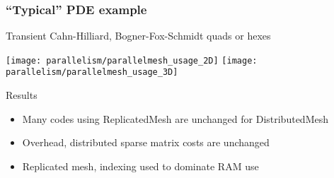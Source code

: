 


\begin{frame}
\frametitle{``Typical'' PDE example}

Transient Cahn-Hilliard, Bogner-Fox-Schmidt quads or hexes

  \texttt{[image: parallelism/parallelmesh\_usage\_2D]}
  \texttt{[image: parallelism/parallelmesh\_usage\_3D]}

\begin{block}{Results}
\begin{itemize}
\item Many codes using ReplicatedMesh are unchanged for DistributedMesh
\item Overhead, distributed sparse matrix costs are unchanged
\item Replicated mesh, indexing used to dominate RAM use
\end{itemize}
\end{block}
\end{frame}


